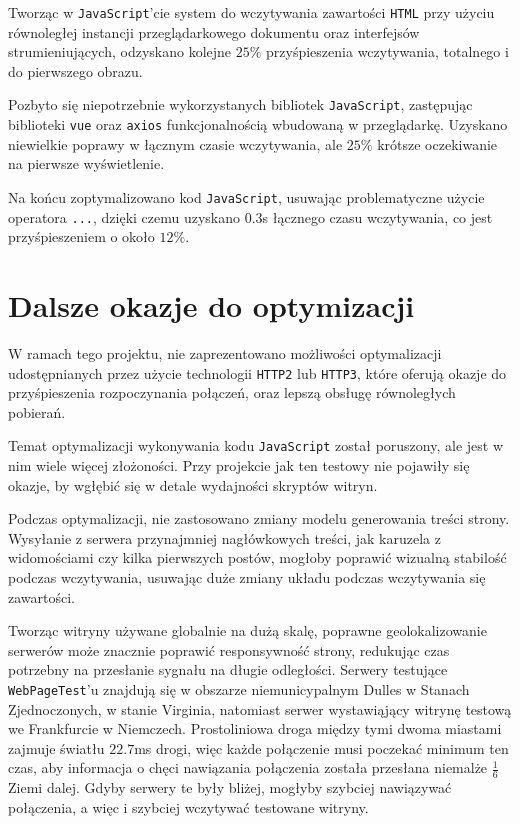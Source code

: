 \documentclass[licencjacka]{pracadypl}
\begin{document}
Tworząc w \texttt{JavaScript}'cie system do wczytywania zawartości \texttt{HTML} przy użyciu równoległej instancji przeglądarkowego dokumentu oraz interfejsów strumieniujących, odzyskano kolejne $25\%$ przyśpieszenia wczytywania, totalnego i do pierwszego obrazu.

Pozbyto się niepotrzebnie wykorzystanych bibliotek \texttt{JavaScript}, zastępując biblioteki \texttt{vue} oraz \texttt{axios} funkcjonalnością wbudowaną w przeglądarkę. Uzyskano niewielkie poprawy w łącznym czasie wczytywania, ale $25\%$ krótsze oczekiwanie na pierwsze wyświetlenie.

Na końcu zoptymalizowano kod \texttt{JavaScript}, usuwając problematyczne użycie operatora \texttt{...}, dzięki czemu uzyskano $0.3$s łącznego czasu wczytywania, co jest przyśpieszeniem o około $12\%$.

\section{Dalsze okazje do optymizacji}

W ramach tego projektu, nie zaprezentowano możliwości optymalizacji udostępnianych przez użycie technologii \texttt{HTTP2} lub \texttt{HTTP3}, które oferują okazje do przyśpieszenia rozpoczynania połączeń, oraz lepszą obsługę równoległych pobierań.

Temat optymalizacji wykonywania kodu \texttt{JavaScript} został poruszony, ale jest w nim wiele więcej złożoności. Przy projekcie jak ten testowy nie pojawiły się okazje, by wgłębić się w detale wydajności skryptów witryn.

Podczas optymalizacji, nie zastosowano zmiany modelu generowania treści strony. Wysyłanie z serwera przynajmniej nagłówkowych treści, jak karuzela z widomościami czy kilka pierwszych postów, mogłoby poprawić wizualną stabilość podczas wczytywania, usuwając duże zmiany układu podczas wczytywania się zawartości.

Tworząc witryny używane globalnie na dużą skalę, poprawne geolokalizowanie serwerów może znacznie poprawić responsywność strony, redukując czas potrzebny na przesłanie sygnału na długie odległości. Serwery testujące \texttt{WebPageTest}'u znajdują się w obszarze niemunicypalnym Dulles w Stanach Zjednoczonych, w stanie Virginia, natomiast serwer wystawiąjący witrynę testową we Frankfurcie w Niemczech. Prostoliniowa droga między tymi dwoma miastami zajmuje światłu $22.7$ms drogi, więc każde połączenie musi poczekać minimum ten czas, aby informacja o chęci nawiązania połączenia została przesłana niemalże $\frac{1}{6}$ Ziemi dalej. Gdyby serwery te były bliżej, mogłyby szybciej nawiązywać połączenia, a więc i szybciej wczytywać testowane witryny.
\end{document}

